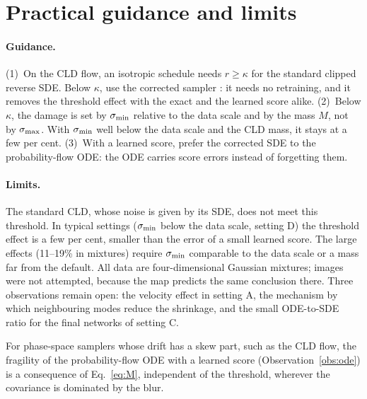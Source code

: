 \section{Practical guidance and limits}
\label{sec:discussion}

\paragraph*{Guidance.}
(1)~On the CLD flow, an isotropic schedule needs $r\geq\kappa$ for the standard clipped reverse SDE.
Below $\kappa$, use the corrected sampler \Sb{}: it needs no retraining, and it removes the threshold effect with the exact and the learned score alike.
(2)~Below $\kappa$, the damage is set by $\sigma_{\min}$ relative to the data scale and by the mass $M$, not by $\sigma_{\max}$.
With $\sigma_{\min}$ well below the data scale and the CLD mass, it stays at a few per cent.
(3)~With a learned score, prefer the corrected SDE to the probability-flow ODE: the ODE carries score errors instead of forgetting them.

\paragraph*{Limits.}
The standard CLD, whose noise is given by its SDE, does not meet this threshold.
In typical settings ($\sigma_{\min}$ below the data scale, setting D) the threshold effect is a few per cent, smaller than the error of a small learned score.
The large effects (11--19\% in mixtures) require $\sigma_{\min}$ comparable to the data scale or a mass far from the default.
All data are four-dimensional Gaussian mixtures; images were not attempted, because the map predicts the same conclusion there.
Three observations remain open: the velocity effect in setting A, the mechanism by which neighbouring modes reduce the shrinkage, and the small ODE-to-SDE ratio for the final networks of setting C.

\begin{conjecture}
For phase-space samplers whose drift has a skew part, such as the CLD flow, the fragility of the probability-flow ODE with a learned score (Observation~\ref{obs:ode}) is a consequence of Eq.~\eqref{eq:M}, independent of the threshold, wherever the covariance is dominated by the blur.
\end{conjecture}

